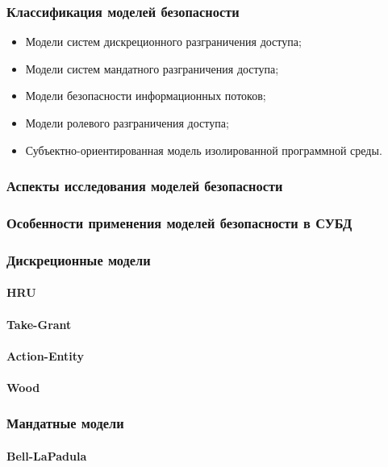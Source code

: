 \subsubsection{Классификация моделей безопасности}

\begin{itemize}
    \item Модели систем дискреционного разграничения доступа;
    \item Модели систем мандатного разграничения доступа;
    \item Модели безопасности информационных потоков;
    \item Модели ролевого разграничения доступа;
    \item Субъектно-ориентированная модель изолированной программной среды.
\end{itemize}

\subsubsection{Аспекты исследования моделей безопасности }
\subsubsection{Особенности применения моделей безопасности в СУБД }

\subsubsection{Дискреционные модели}
\paragraph{HRU}
\paragraph{Take-Grant}
\paragraph{Action-Entity}
\paragraph{Wood}

\subsubsection{Мандатные модели}
\paragraph{Bell-LaPadula}
